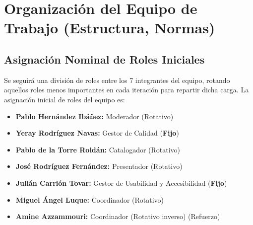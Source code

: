 \newpage
\section{Organización del Equipo de Trabajo (Estructura, Normas)}

\subsection{Asignación Nominal de Roles Iniciales}
Se seguirá una división de roles entre los 7 integrantes del equipo, rotando aquellos roles menos importantes en cada iteración para repartir dicha carga. La asignación inicial de roles del equipo es:
\begin{itemize}[leftmargin=*]
  \item \textbf{Pablo Hernández Ibáñez:} Moderador (Rotativo)
  \item \textbf{Yeray Rodríguez Navas:} Gestor de Calidad (\textbf{Fijo})
  \item \textbf{Pablo de la Torre Roldán:} Catalogador (Rotativo)
  \item \textbf{José Rodríguez Fernández:} Presentador (Rotativo)
  \item \textbf{Julián Carrión Tovar:} Gestor de Usabilidad y Accesibilidad (\textbf{Fijo})
  \item \textbf{Miguel Ángel Luque:} Coordinador (Rotativo)
  \item \textbf{Amine Azzammouri: } Coordinador (Rotativo inverso) (Refuerzo)
\end{itemize}

